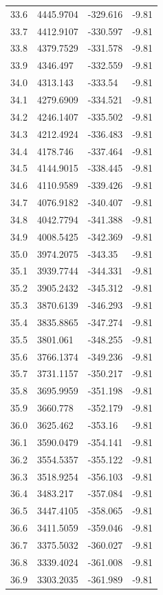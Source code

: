 \begin{table}[H]
\begin{tabular}{llll}
33.6 & 4445.9704 & -329.616 & -9.81 \\
33.7 & 4412.9107 & -330.597 & -9.81 \\
33.8 & 4379.7529 & -331.578 & -9.81 \\
33.9 & 4346.497 & -332.559 & -9.81 \\
34.0 & 4313.143 & -333.54 & -9.81 \\
34.1 & 4279.6909 & -334.521 & -9.81 \\
34.2 & 4246.1407 & -335.502 & -9.81 \\
34.3 & 4212.4924 & -336.483 & -9.81 \\
34.4 & 4178.746 & -337.464 & -9.81 \\
34.5 & 4144.9015 & -338.445 & -9.81 \\
34.6 & 4110.9589 & -339.426 & -9.81 \\
34.7 & 4076.9182 & -340.407 & -9.81 \\
34.8 & 4042.7794 & -341.388 & -9.81 \\
34.9 & 4008.5425 & -342.369 & -9.81 \\
35.0 & 3974.2075 & -343.35 & -9.81 \\
35.1 & 3939.7744 & -344.331 & -9.81 \\
35.2 & 3905.2432 & -345.312 & -9.81 \\
35.3 & 3870.6139 & -346.293 & -9.81 \\
35.4 & 3835.8865 & -347.274 & -9.81 \\
35.5 & 3801.061 & -348.255 & -9.81 \\
35.6 & 3766.1374 & -349.236 & -9.81 \\
35.7 & 3731.1157 & -350.217 & -9.81 \\
35.8 & 3695.9959 & -351.198 & -9.81 \\
35.9 & 3660.778 & -352.179 & -9.81 \\
36.0 & 3625.462 & -353.16 & -9.81 \\
36.1 & 3590.0479 & -354.141 & -9.81 \\
36.2 & 3554.5357 & -355.122 & -9.81 \\
36.3 & 3518.9254 & -356.103 & -9.81 \\
36.4 & 3483.217 & -357.084 & -9.81 \\
36.5 & 3447.4105 & -358.065 & -9.81 \\
36.6 & 3411.5059 & -359.046 & -9.81 \\
36.7 & 3375.5032 & -360.027 & -9.81 \\
36.8 & 3339.4024 & -361.008 & -9.81 \\
36.9 & 3303.2035 & -361.989 & -9.81 \\

\end{tabular}
\end{table}
